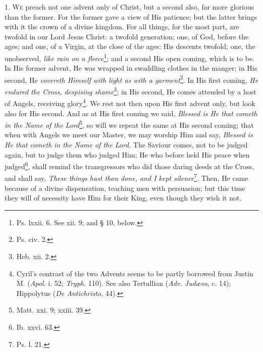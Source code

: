 1. \textsc{We} preach not one advent only of Christ, but a second also, far more glorious than the former. For the former gave a view of His patience; but the latter brings with it the crown of a divine kingdom. For all things, for the most part, are twofold in our Lord Jesus Christ: a twofold generation; one, of God, before the ages; and one, of a Virgin, at the close of the ages: His descents twofold; one, the unobserved, \emph{like rain on a fleece}\footnote{Ps. lxxii. 6. See xii. 9; and § 10, below.}; and a second His open coming, which is to be. In His former advent, He was wrapped in swaddling clothes in the manger; in His second, He \emph{covereth Himself with light as with a garment}\footnote{Ps. civ. 2.}. In His first coming, \emph{He endured the Cross, despising shame}\footnote{Heb. xii. 2.}; in His second, He comes attended by a host of Angels, receiving glory\footnote{Cyril’s contrast of the two Advents seems to be partly borrowed from Justin M. (\emph{Apol}. i. 52; \emph{Tryph}. 110). See also Tertullian (\emph{Adv. Judæos}, c. 14); Hippolytus (\emph{De Antichristo}, 44).}. We rest not then upon His first advent only, but look also for His second. And as at His first coming we said, \emph{Blessed is He that cometh in the Name of the Lord}\footnote{Matt. xxi. 9; xxiii. 39.}, so will we repeat the same at His second coming; that when with Angels we meet our Master, we may worship Him and say, \emph{Blessed is He that cometh in the Name of the Lord}. The Saviour comes, not to be judged again, but to judge them who judged Him; He who before held His peace when judged\footnote{Ib. xxvi. 63.}, shall remind the transgressors who did those daring deeds at the Cross, and shall say, \emph{These things hast thou done, and I kept silence}\footnote{Ps. l. 21.}. Then, He came because of a divine dispensation, teaching men with persuasion; but this time they will of necessity have Him for their King, even though they wish it not.

